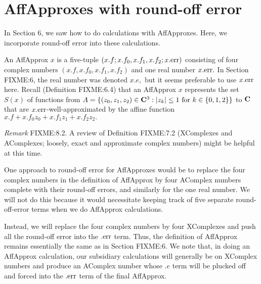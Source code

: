 \section{AffApproxes with round-off error}
 
In Section 6, we saw how to do calculations with AffApproxes.  Here, we incorporate round-off error into
these calculations.  

An AffApprox $x$ is a five-tuple
$(x.f; x.f_0,x.f_1,x.f_2; x.{\rm err})$
consisting of four complex numbers $(x.f, x.f_0,x.f_1, x.f_2)$ and one real number $x.{\rm err}.$  In Section FIXME:6, the
real number was denoted $x.e,$ but it seems preferable to use $x.{\rm err}$ here.  Recall (Definition FIXME:6.4)
that an AffApprox $x$ represents the set $S(x)$ of functions from $A = \{(z_0,z_1,z_2) \in {\bf C}^3 : |z_k| \le 1 \
{\rm for} \ k \in \{0,1,2\}\}$ to ${\bf C}$ that are $x.{\rm err}$-well-approximated by the affine function
$x.f + x.f_0 z_0 + x.f_1 z_1 + x.f_2 z_2.$
\enddemo

{\it Remark} FIXME:8.2.
A review of Definition FIXME:7.2 (XComplexes and AComplexes; loosely, exact and approximate complex numbers) might be helpful at this time.

One approach to round-off error for AffApproxes would be to replace the four complex numbers in the definition of AffApprox by four AComplex numbers complete with their round-off errors, and similarly for the one real number.  We will not do this because it would necessitate keeping track of five separate round-off-error terms when we do AffApprox calculations.

Instead, we will 
replace the four complex numbers by four XComplexes and push all the round-off error into the $.{\rm err}$ term.  
Thus, the definition of AffApprox remains 
essentially the same as in Section FIXME:6.
We note that, in doing an AffApprox calculation, our subsidiary calculations will generally be on XComplex numbers and produce an AComplex number whose $.e$ term will be plucked off and forced into the $.{\rm err}$ term of the final AffApprox.

